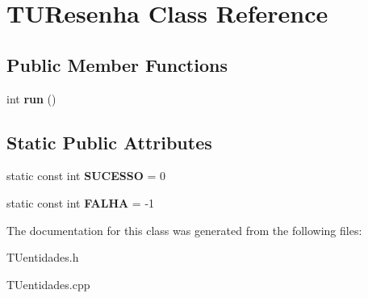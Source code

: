 \hypertarget{classTUResenha}{}\section{T\+U\+Resenha Class Reference}
\label{classTUResenha}
\subsection*{Public Member Functions}
\begin{DoxyCompactItemize}
\item 
\mbox{\label{classTUResenha_a255531383ebe29a85c654a848288d89c}} 
int {\bfseries run} ()
\end{DoxyCompactItemize}
\subsection*{Static Public Attributes}
\begin{DoxyCompactItemize}
\item 
\mbox{\label{classTUResenha_a851535b308f0a5a46a465fc428128ea0}} 
static const int {\bfseries S\+U\+C\+E\+S\+SO} = 0
\item 
\mbox{\label{classTUResenha_a947f43cb8d4384ab279d9884232dc5f7}} 
static const int {\bfseries F\+A\+L\+HA} = -\/1
\end{DoxyCompactItemize}


The documentation for this class was generated from the following files\+:\begin{DoxyCompactItemize}
\item 
T\+Uentidades.\+h\item 
T\+Uentidades.\+cpp\end{DoxyCompactItemize}
